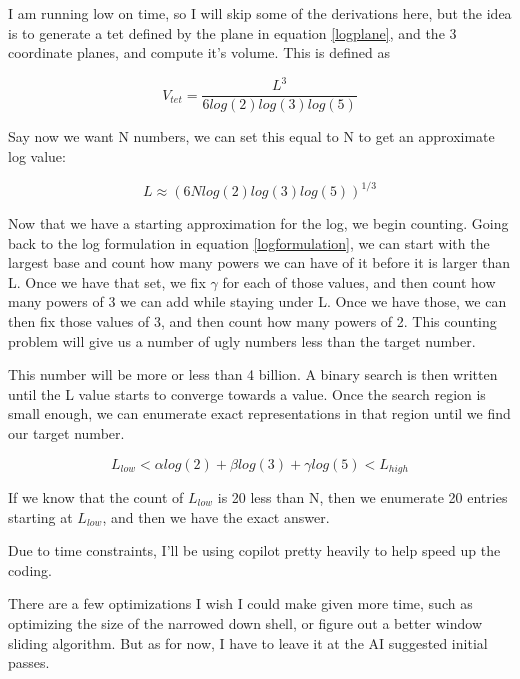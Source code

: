 \documentclass{article}
\begin{document}
I am running low on time, so I will skip some of the derivations here, but the idea is to generate a tet defined by the plane in equation \ref{logplane}, and the 3 coordinate planes, and compute it's volume. This is defined as

\begin{equation}
    V_{tet} = \frac{L^{3}}{6 log(2)log(3)log(5)}
\end{equation}

Say now we want N numbers, we can set this equal to N to get an approximate log value:

\begin{equation}
    L \approx (6N log(2) log(3) log(5))^{1/3}
\end{equation}

Now that we have a starting approximation for the log, we begin counting. Going back to the log formulation in equation \ref{logformulation}, we can start with the largest base and count how many powers we can have of it before it is larger than L. Once we have that set, we fix $\gamma$ for each of those values, and then count how many powers of 3 we can add while staying under L. Once we have those, we can then fix those values of 3, and then count how many powers of 2. This counting problem will give us a number of ugly numbers less than the target number. \newline

This number will be more or less than 4 billion. A binary search is then written until the L value starts to converge towards a value. Once the search region is small enough, we can enumerate exact representations in that region until we find our target number.

\begin{equation}
    L_{low} < \alpha log(2) + \beta log(3) + \gamma log(5) < L_{high}
\end{equation}

If we know that the count of $L_{low}$ is 20 less than N, then we enumerate 20 entries starting at $L_{low}$, and then we have the exact answer. \newline

Due to time constraints, I'll be using copilot pretty heavily to help speed up the coding. \newline

There are a few optimizations I wish I could make given more time, such as optimizing the size of the narrowed down shell, or figure out a better window sliding algorithm. But as for now, I have to leave it at the AI suggested initial passes. \newline
\end{document}
